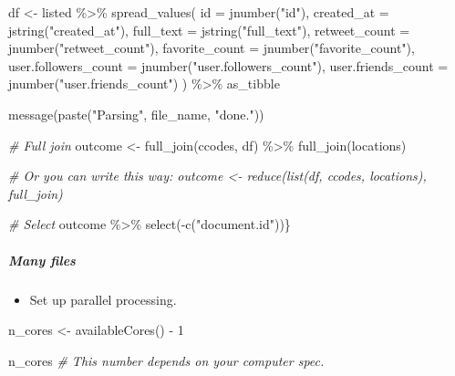 \documentclass[
]{book}
\newenvironment{Shaded}{\begin{snugshade}}{\end{snugshade}}
\newcommand{\AttributeTok}[1]{\textcolor[rgb]{0.77,0.63,0.00}{#1}}
\newcommand{\CommentTok}[1]{\textcolor[rgb]{0.56,0.35,0.01}{\textit{#1}}}
\newcommand{\DecValTok}[1]{\textcolor[rgb]{0.00,0.00,0.81}{#1}}
\newcommand{\FunctionTok}[1]{\textcolor[rgb]{0.00,0.00,0.00}{#1}}
\newcommand{\NormalTok}[1]{#1}
\newcommand{\OtherTok}[1]{\textcolor[rgb]{0.56,0.35,0.01}{#1}}
\newcommand{\SpecialCharTok}[1]{\textcolor[rgb]{0.00,0.00,0.00}{#1}}
\newcommand{\StringTok}[1]{\textcolor[rgb]{0.31,0.60,0.02}{#1}}
\providecommand{\tightlist}{%
  \setlength{\itemsep}{0pt}\setlength{\parskip}{0pt}}
\begin{document}
\begin{Shaded}
\begin{Highlighting}[]
\NormalTok{df }\OtherTok{\textless{}{-}}\NormalTok{ listed }\SpecialCharTok{\%\textgreater{}\%}
  \FunctionTok{spread\_values}\NormalTok{(}
    \AttributeTok{id =} \FunctionTok{jnumber}\NormalTok{(}\StringTok{"id"}\NormalTok{),}
    \AttributeTok{created\_at =} \FunctionTok{jstring}\NormalTok{(}\StringTok{"created\_at"}\NormalTok{),}
    \AttributeTok{full\_text =} \FunctionTok{jstring}\NormalTok{(}\StringTok{"full\_text"}\NormalTok{),}
    \AttributeTok{retweet\_count =} \FunctionTok{jnumber}\NormalTok{(}\StringTok{"retweet\_count"}\NormalTok{),}
    \AttributeTok{favorite\_count =} \FunctionTok{jnumber}\NormalTok{(}\StringTok{"favorite\_count"}\NormalTok{),}
    \AttributeTok{user.followers\_count =} \FunctionTok{jnumber}\NormalTok{(}\StringTok{"user.followers\_count"}\NormalTok{),}
    \AttributeTok{user.friends\_count =} \FunctionTok{jnumber}\NormalTok{(}\StringTok{"user.friends\_count"}\NormalTok{)}
\NormalTok{  ) }\SpecialCharTok{\%\textgreater{}\%}
\NormalTok{      as\_tibble}

\FunctionTok{message}\NormalTok{(}\FunctionTok{paste}\NormalTok{(}\StringTok{"Parsing"}\NormalTok{, file\_name, }\StringTok{"done."}\NormalTok{))}

\CommentTok{\# Full join}
\NormalTok{outcome }\OtherTok{\textless{}{-}} \FunctionTok{full\_join}\NormalTok{(ccodes, df) }\SpecialCharTok{\%\textgreater{}\%} \FunctionTok{full\_join}\NormalTok{(locations)}

\CommentTok{\# Or you can write this way: outcome \textless{}{-} reduce(list(df, ccodes, locations), full\_join)}

\CommentTok{\# Select}
\NormalTok{outcome }\SpecialCharTok{\%\textgreater{}\%} \FunctionTok{select}\NormalTok{(}\SpecialCharTok{{-}}\FunctionTok{c}\NormalTok{(}\StringTok{"document.id"}\NormalTok{))\}}
\end{Highlighting}
\end{Shaded}

\hypertarget{many-files}{%
\subparagraph{Many files}\label{many-files}}

\begin{itemize}
\tightlist
\item
  Set up parallel processing.
\end{itemize}

\begin{Shaded}
\begin{Highlighting}[]
\NormalTok{n\_cores }\OtherTok{\textless{}{-}} \FunctionTok{availableCores}\NormalTok{() }\SpecialCharTok{{-}} \DecValTok{1}

\NormalTok{n\_cores }\CommentTok{\# This number depends on your computer spec.}
\end{Highlighting}
\end{Shaded}
\end{document}

